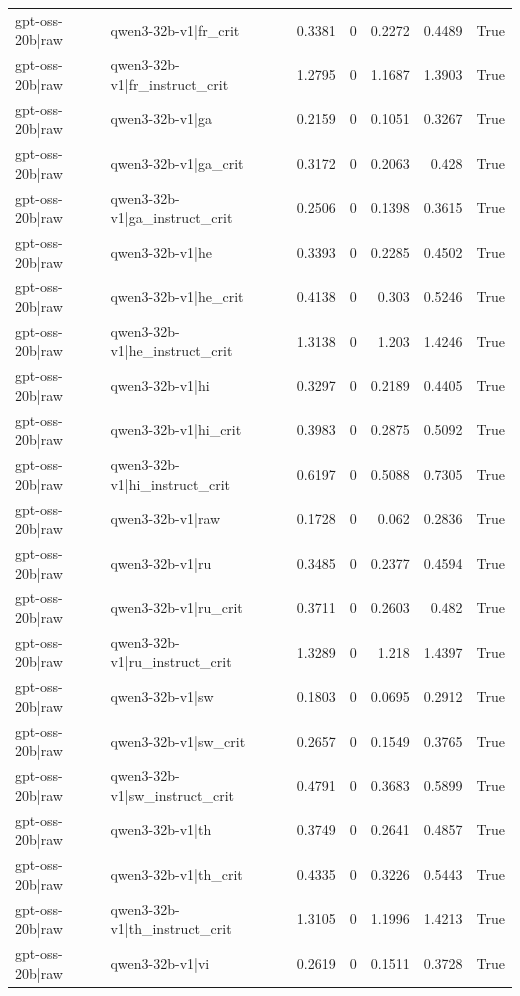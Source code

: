 \begin{table}
\begin{tabular}{l l r r r r l}
gpt-oss-20b|raw & qwen3-32b-v1|fr_crit & 0.3381 & 0 & 0.2272 & 0.4489 & True \\
gpt-oss-20b|raw & qwen3-32b-v1|fr_instruct_crit & 1.2795 & 0 & 1.1687 & 1.3903 & True \\
gpt-oss-20b|raw & qwen3-32b-v1|ga & 0.2159 & 0 & 0.1051 & 0.3267 & True \\
gpt-oss-20b|raw & qwen3-32b-v1|ga_crit & 0.3172 & 0 & 0.2063 & 0.428 & True \\
gpt-oss-20b|raw & qwen3-32b-v1|ga_instruct_crit & 0.2506 & 0 & 0.1398 & 0.3615 & True \\
gpt-oss-20b|raw & qwen3-32b-v1|he & 0.3393 & 0 & 0.2285 & 0.4502 & True \\
gpt-oss-20b|raw & qwen3-32b-v1|he_crit & 0.4138 & 0 & 0.303 & 0.5246 & True \\
gpt-oss-20b|raw & qwen3-32b-v1|he_instruct_crit & 1.3138 & 0 & 1.203 & 1.4246 & True \\
gpt-oss-20b|raw & qwen3-32b-v1|hi & 0.3297 & 0 & 0.2189 & 0.4405 & True \\
gpt-oss-20b|raw & qwen3-32b-v1|hi_crit & 0.3983 & 0 & 0.2875 & 0.5092 & True \\
gpt-oss-20b|raw & qwen3-32b-v1|hi_instruct_crit & 0.6197 & 0 & 0.5088 & 0.7305 & True \\
gpt-oss-20b|raw & qwen3-32b-v1|raw & 0.1728 & 0 & 0.062 & 0.2836 & True \\
gpt-oss-20b|raw & qwen3-32b-v1|ru & 0.3485 & 0 & 0.2377 & 0.4594 & True \\
gpt-oss-20b|raw & qwen3-32b-v1|ru_crit & 0.3711 & 0 & 0.2603 & 0.482 & True \\
gpt-oss-20b|raw & qwen3-32b-v1|ru_instruct_crit & 1.3289 & 0 & 1.218 & 1.4397 & True \\
gpt-oss-20b|raw & qwen3-32b-v1|sw & 0.1803 & 0 & 0.0695 & 0.2912 & True \\
gpt-oss-20b|raw & qwen3-32b-v1|sw_crit & 0.2657 & 0 & 0.1549 & 0.3765 & True \\
gpt-oss-20b|raw & qwen3-32b-v1|sw_instruct_crit & 0.4791 & 0 & 0.3683 & 0.5899 & True \\
gpt-oss-20b|raw & qwen3-32b-v1|th & 0.3749 & 0 & 0.2641 & 0.4857 & True \\
gpt-oss-20b|raw & qwen3-32b-v1|th_crit & 0.4335 & 0 & 0.3226 & 0.5443 & True \\
gpt-oss-20b|raw & qwen3-32b-v1|th_instruct_crit & 1.3105 & 0 & 1.1996 & 1.4213 & True \\
gpt-oss-20b|raw & qwen3-32b-v1|vi & 0.2619 & 0 & 0.1511 & 0.3728 & True \\

\end{tabular}
\end{table}
